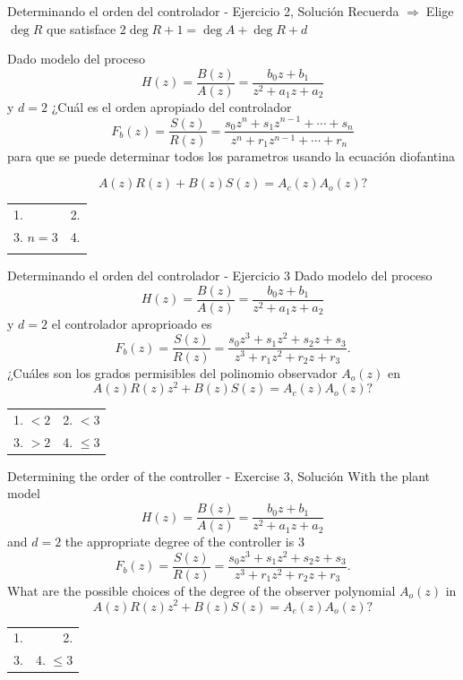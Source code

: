 \documentclass[presentation,aspectratio=169]{beamer}
\begin{document}
\begin{frame}[label={sec:org0cc5354}]{Determinando el orden del controlador - Ejercicio 2, Solución}
Recuerda    \alert{\(\Rightarrow\;\)Elige \(\deg R\) que satisface \(2\deg R + 1 = \deg A + \deg R + d\)}

   Dado modelo del proceso \[H(z) = \frac{B(z)}{A(z)} = \frac{b_0z + b_1}{z^2 + a_1z + a_2}\] y \(d=2\)  ¿Cuál es el orden apropiado del controlador 
\[F_b(z) = \frac{S(z)}{R(z)} = \frac{s_0z^n + s_1z^{n-1} + \cdots + s_n}{z^n + r_1 z^{n-1} + \cdots + r_n}\]
para que se puede determinar todos los parametros usando la ecuación diofantina

\[ A(z)R(z) + B(z)S(z) = A_c(z)A_o(z)?\]

\begin{center}
\begin{tabular}{lr}
1. & 2.\\
3. \(n=3\) & 4.\\
 & \\
\end{tabular}
\end{center}
\end{frame}


\begin{frame}[label={sec:org3b9df77}]{Determinando el orden del controlador - Ejercicio 3}
   Dado modelo del proceso \[H(z) = \frac{B(z)}{A(z)} = \frac{b_0z + b_1}{z^2 + a_1z + a_2}\] y \(d=2\)   el controlador aproprioado es 
\[F_b(z) = \frac{S(z)}{R(z)} = \frac{s_0z^3 + s_1z^2 + s_2z + s_3}{z^3 + r_1 z^2 + r_2z + r_3}.\]
¿Cuáles son los grados permisibles del polinomio observador \(A_o(z)\) en
   \[ A(z)R(z)z^2 + B(z)S(z) = A_c(z)A_o(z)?\]

\begin{center}
\begin{tabular}{ll}
1. \(< 2\) & 2. \(< 3\)\\
3. \(> 2\) & 4. \(\le 3\)\\
\end{tabular}
\end{center}
\end{frame}

\begin{frame}[label={sec:org30afa69}]{Determining the order of the controller - Exercise 3, Solución}
With the plant model \[H(z) = \frac{B(z)}{A(z)} = \frac{b_0z + b_1}{z^2 + a_1z + a_2}\] and \(d=2\)    the appropriate degree of the controller is 3
\[F_b(z) = \frac{S(z)}{R(z)} = \frac{s_0z^3 + s_1z^2 + s_2z + s_3}{z^3 + r_1 z^2 + r_2z + r_3}.\]
What are the possible choices of the degree of the observer polynomial \(A_o(z)\) in
\[ A(z)R(z)z^2 + B(z)S(z) = A_c(z)A_o(z)?\]
\begin{center}
\begin{tabular}{rr}
1. & 2.\\
3. & 4. \(\le 3\)\\
\end{tabular}
\end{center}
\end{frame}
\end{document}
